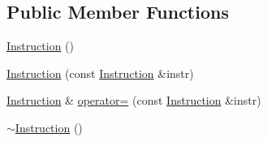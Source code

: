 \subsection*{Public Member Functions}
\begin{DoxyCompactItemize}
\item 
\hyperlink{structtvm_1_1runtime_1_1vm_1_1Instruction_afb6a19291861797375b04b07f174614b}{Instruction} ()
\item 
\hyperlink{structtvm_1_1runtime_1_1vm_1_1Instruction_a22bf3a1b6b92af774cf87893d091d5ce}{Instruction} (const \hyperlink{structtvm_1_1runtime_1_1vm_1_1Instruction}{Instruction} \&instr)
\item 
\hyperlink{structtvm_1_1runtime_1_1vm_1_1Instruction}{Instruction} \& \hyperlink{structtvm_1_1runtime_1_1vm_1_1Instruction_a69c12a9470f67ea26e53172f5c9220a1}{operator=} (const \hyperlink{structtvm_1_1runtime_1_1vm_1_1Instruction}{Instruction} \&instr)
\item 
\hyperlink{structtvm_1_1runtime_1_1vm_1_1Instruction_aff9f0ab6000156b24ef3631caf5972bd}{$\sim$\+Instruction} ()
\end{DoxyCompactItemize}
